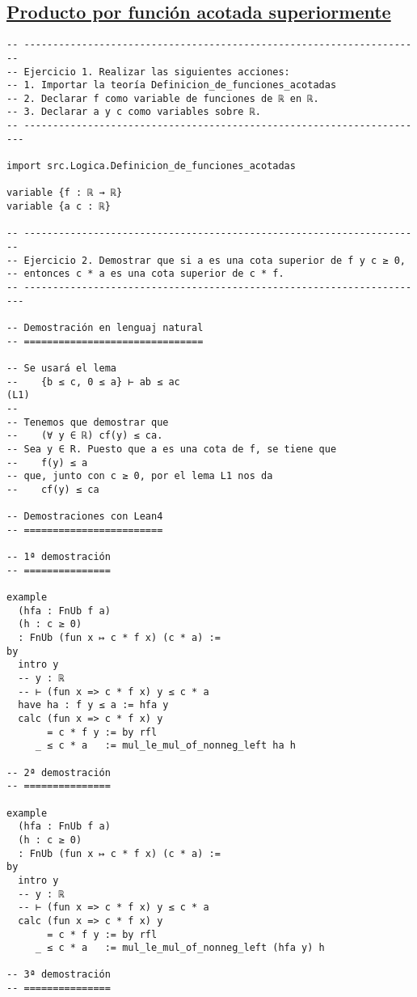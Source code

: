 \subsection{\href{./src/Logica/Producto\_por\_funcion\_acotada\_superiormente.lean}{Producto por función acotada superiormente}}
\label{sec:org29e71e0}
\begin{verbatim}
-- ---------------------------------------------------------------------
-- Ejercicio 1. Realizar las siguientes acciones:
-- 1. Importar la teoría Definicion_de_funciones_acotadas
-- 2. Declarar f como variable de funciones de ℝ en ℝ.
-- 3. Declarar a y c como variables sobre ℝ.
-- ----------------------------------------------------------------------

import src.Logica.Definicion_de_funciones_acotadas

variable {f : ℝ → ℝ}
variable {a c : ℝ}

-- ---------------------------------------------------------------------
-- Ejercicio 2. Demostrar que si a es una cota superior de f y c ≥ 0,
-- entonces c * a es una cota superior de c * f.
-- ----------------------------------------------------------------------

-- Demostración en lenguaj natural
-- ===============================

-- Se usará el lema
--    {b ≤ c, 0 ≤ a} ⊢ ab ≤ ac                                      (L1)
--
-- Tenemos que demostrar que
--    (∀ y ∈ ℝ) cf(y) ≤ ca.
-- Sea y ∈ R. Puesto que a es una cota de f, se tiene que
--    f(y) ≤ a
-- que, junto con c ≥ 0, por el lema L1 nos da
--    cf(y) ≤ ca

-- Demostraciones con Lean4
-- ========================

-- 1ª demostración
-- ===============

example
  (hfa : FnUb f a)
  (h : c ≥ 0)
  : FnUb (fun x ↦ c * f x) (c * a) :=
by
  intro y
  -- y : ℝ
  -- ⊢ (fun x => c * f x) y ≤ c * a
  have ha : f y ≤ a := hfa y
  calc (fun x => c * f x) y
       = c * f y := by rfl
     _ ≤ c * a   := mul_le_mul_of_nonneg_left ha h

-- 2ª demostración
-- ===============

example
  (hfa : FnUb f a)
  (h : c ≥ 0)
  : FnUb (fun x ↦ c * f x) (c * a) :=
by
  intro y
  -- y : ℝ
  -- ⊢ (fun x => c * f x) y ≤ c * a
  calc (fun x => c * f x) y
       = c * f y := by rfl
     _ ≤ c * a   := mul_le_mul_of_nonneg_left (hfa y) h

-- 3ª demostración
-- ===============


\end{verbatim}
